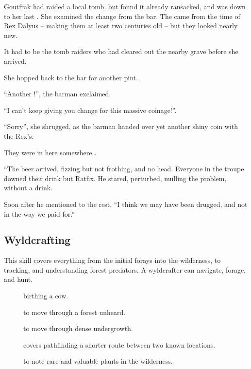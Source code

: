 \begin{multicols}{2}
\ifodd\value{r4}
\begin{exampletext}
  Goutfrak had raided a local tomb, but found it already ransacked, and was down to her last .
  She examined the change from the bar.
  The  came from the time of Rex Dalyus -- making them at least two centuries old -- but they looked nearly new.

  It had to be the tomb raiders who had cleared out the nearby grave before she arrived.

  She hopped back to the bar for another pint.

  ``Another !'',
  the barman exclaimed.

  ``I can't keep giving you change for this massive coinage!''.

  ``Sorry'',
  she shrugged, as the barman handed over yet another shiny coin with the Rex's.

  They were in here somewhere\ldots

\end{exampletext}

\else

\begin{exampletext}
  ``The beer arrived, fizzing but not frothing, and no head.
  Everyone in the troupe downed their drink but Ratfix.
  He stared, perturbed, mulling the problem, without a drink.

  Soon after he mentioned to the rest,
  ``I think we may have been drugged, and not in the way we paid for.''
\end{exampletext}
\fi

\subsection{Wyldcrafting}

This skill covers everything from the initial forays into the wilderness, to tracking, and understanding forest predators.
A wyldcrafter can navigate, forage, and hunt.

\begin{description}
  \item[]
    birthing a cow.
  \item[]
    to move through a forest unheard.
  \item[]
    to move through dense undergrowth.
  \item[]
    covers pathfinding a shorter route between two known locations.
  \item[]
    to note rare and valuable plants in the wilderness.
\end{description}


\end{multicols}
